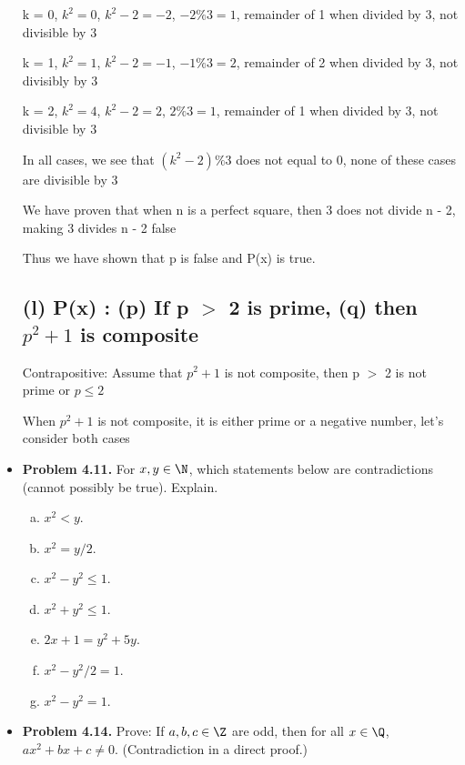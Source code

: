 \documentclass[11pt]{article}
\begin{document}
\begin{itemize}
  k = 0, \(k^2 = 0\), \(k^2-2=-2\), \(-2 \% 3 = 1\), remainder of 1 when divided by 3, not divisible by 3
  
  k = 1, \(k^2 = 1\), \(k^2-2=-1\), \(-1 \% 3 = 2\), remainder of 2 when divided by 3, not divisibly by 3

  k = 2, \(k^2 = 4\), \(k^2-2=2\), \(2 \% 3 = 1\), remainder of 1 when divided by 3, not divisible by 3

  In all cases, we see that \((k^2-2)\%3\) does not equal to 0, none of these cases are divisible by 3

  We have proven that when n is a perfect square, then 3 does not divide n - 2, making 3 divides n - 2 false

  Thus we have shown that p is false and P(x) is true.

  \subsection*{(l) P(x) : (p) If p $>$ 2 is prime, (q) then \(p^2+1\) is composite}
  
  Contrapositive: Assume that \(p^2+1\) is not composite, then p $>$ 2 is not prime or \(p \leq 2\) 

  When \(p^2+1\) is not composite, it is either prime or a negative number, let's consider both cases

  

\vspace{0.1in}

\item \textbf{Problem 4.11.}
  For $x,y\in\N$, which statements below are contradictions (cannot possibly be true).
  Explain.
  \begin{enumerate}[(a)]
  \item $x^2<y$.
  \item $x^2=y/2$.
  \item $x^2-y^2\le 1$.
  \item $x^2+y^2\le 1$.
  \item $2x+1=y^2+5y$.
  \item $x^2-y^2/2=1$.
  \item $x^2-y^2=1$.
  \end{enumerate}

\vspace{0.1in}

\item \textbf{Problem 4.14.}
  Prove: If $a,b,c\in\Z$ are odd, then for all $x\in\Q$,
  $ax^2+bx+c\ne 0$.
  (Contradiction in a direct proof.)


\end{itemize}
\end{document}

